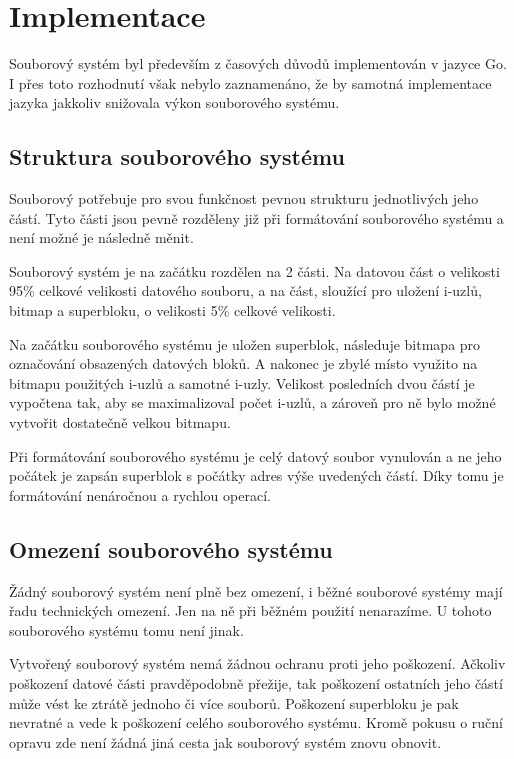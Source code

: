 \documentclass[12pt, a4paper]{article}
\begin{document}
    \section{Implementace}
    Souborový systém byl především z časových důvodů implementován v jazyce Go.
    I přes toto rozhodnutí však nebylo zaznamenáno, že by samotná implementace jazyka jakkoliv snižovala výkon souborového systému.

    \subsection{Struktura souborového systému}
    Souborový potřebuje pro svou funkčnost pevnou strukturu jednotlivých jeho částí.
    Tyto části jsou pevně rozděleny již při formátování souborového systému a není možné je následně měnit.
    
    Souborový systém je na začátku rozdělen na 2 části. Na datovou část o velikosti 95\% celkové velikosti datového souboru, a na část, sloužící pro uložení i-uzlů, bitmap a superbloku, o velikosti 5\% celkové velikosti.

    Na začátku souborového systému je uložen superblok, následuje bitmapa pro označování obsazených datových bloků.
    A nakonec je zbylé místo využito na bitmapu použitých i-uzlů a samotné i-uzly.
    Velikost posledních dvou částí je vypočtena tak, aby se maximalizoval počet i-uzlů, a zároveň pro ně bylo možné vytvořit dostatečně velkou bitmapu.

    Při formátování souborového systému je celý datový soubor vynulován a ne jeho počátek je zapsán superblok s počátky adres výše uvedených částí.
    Díky tomu je formátování nenáročnou a rychlou operací.



    \subsection{Omezení souborového systému}
    Žádný souborový systém není plně bez omezení, i běžné souborové systémy mají řadu technických omezení.
    Jen na ně při běžném použití nenarazíme.
    U tohoto souborového systému tomu není jinak.

    Vytvořený souborový systém nemá žádnou ochranu proti jeho poškození.
    Ačkoliv poškození datové části pravděpodobně přežije, tak poškození ostatních jeho částí může vést ke ztrátě jednoho či více souborů.
    Poškození superbloku je pak nevratné a vede k poškození celého souborového systému.
    Kromě pokusu o ruční opravu zde není žádná jiná cesta jak souborový systém znovu obnovit.
\end{document}
